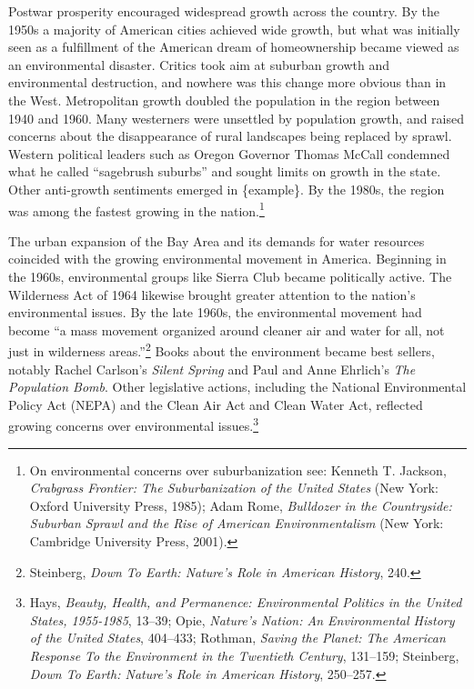 \documentclass[11pt,article,oneside]{memoir}
\begin{document}
Postwar prosperity encouraged widespread growth across the country. By
the 1950s a majority of American cities achieved wide growth, but what
was initially seen as a fulfillment of the American dream of
homeownership became viewed as an environmental disaster. Critics took
aim at suburban growth and environmental destruction, and nowhere was
this change more obvious than in the West. Metropolitan growth doubled
the population in the region between 1940 and 1960. Many westerners were
unsettled by population growth, and raised concerns about the
disappearance of rural landscapes being replaced by sprawl. Western
political leaders such as Oregon Governor Thomas McCall condemned what
he called ``sagebrush suburbs'' and sought limits on growth in the
state. Other anti-growth sentiments emerged in \{example\}. By the
1980s, the region was among the fastest growing in the nation.\footnote{On
  environmental concerns over suburbanization see: Kenneth T. Jackson,
  \emph{Crabgrass Frontier: The Suburbanization of the United States}
  (New York: Oxford University Press, 1985); Adam Rome, \emph{Bulldozer
  in the Countryside: Suburban Sprawl and the Rise of American
  Environmentalism} (New York: Cambridge University Press, 2001).}

The urban expansion of the Bay Area and its demands for water resources
coincided with the growing environmental movement in America. Beginning
in the 1960s, environmental groups like Sierra Club became politically
active. The Wilderness Act of 1964 likewise brought greater attention to
the nation's environmental issues. By the late 1960s, the environmental
movement had become ``a mass movement organized around cleaner air and
water for all, not just in wilderness areas.''\footnote{Steinberg,
  \emph{Down To Earth: Nature's Role in American History}, 240.} Books
about the environment became best sellers, notably Rachel Carlson's
\emph{Silent Spring} and Paul and Anne Ehrlich's \emph{The Population
Bomb}. Other legislative actions, including the National Environmental
Policy Act (NEPA) and the Clean Air Act and Clean Water Act, reflected
growing concerns over environmental issues.\footnote{Hays, \emph{Beauty,
  Health, and Permanence: Environmental Politics in the United States,
  1955-1985}, 13--39; Opie, \emph{Nature's Nation: An Environmental
  History of the United States}, 404--433; Rothman, \emph{Saving the
  Planet: The American Response To the Environment in the Twentieth
  Century}, 131--159; Steinberg, \emph{Down To Earth: Nature's Role in
  American History}, 250--257.}
\end{document}
